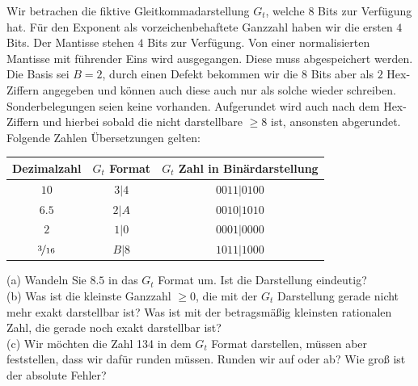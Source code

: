 \documentclass{scrartcl}
\begin{document}
	Wir betrachen die fiktive Gleitkommadarstellung $G_t$, welche $8$ Bits zur Verfügung hat. Für den Exponent als vorzeichenbehaftete Ganzzahl haben wir die ersten $4$ Bits. Der Mantisse stehen $4$ Bits zur Verfügung. Von einer normalisierten Mantisse mit führender Eins wird ausgegangen. Diese muss  abgespeichert werden. Die Basis sei $B = 2$, durch einen Defekt bekommen wir die $8$ Bits aber als $2$ Hex-Ziffern angegeben und können auch diese auch nur als solche wieder schreiben. Sonderbelegungen seien keine vorhanden.
	\n
	Aufgerundet wird auch nach dem Hex-Ziffern und hierbei sobald die nicht darstellbare $\ge 8$ ist, ansonsten abgerundet.
	\n
	 Folgende Zahlen Übersetzungen gelten: \n
	\begin{tabular}{ccc}
		Dezimalzahl & $G_t$ Format & $G_t$ Zahl in Binärdarstellung \\ \toprule
		$10$ 	& $3|4$ 	& $0011|0100$\\
		$6.5$ 	& $2|A$ 	& $0010|1010$ \\
		$2$ 	& $1|0$ 	& $0001|0000$ \\
		$\nicefrac{3}{16}$ 	& $B|8$		& $1011|1000$
	\end{tabular}
	\n
	(a) 
	Wandeln Sie $8.5$ in das $G_t$ Format um. Ist die Darstellung eindeutig?
	\lbreak \lbreak \lbreak
	\\
	(b) 
	Was ist die kleinste Ganzzahl $\ge 0$, die mit der $G_t$ Darstellung gerade nicht mehr exakt darstellbar ist?
	\n 
	Was ist mit der betragsmäßig kleinsten rationalen Zahl, die gerade noch exakt darstellbar ist?
	\lbreak \lbreak \lbreak
	\\
	(c) 
	Wir möchten die Zahl 134 in dem $G_t$ Format darstellen, müssen aber feststellen, dass wir dafür runden müssen. Runden wir auf oder ab? Wie groß ist der absolute Fehler?
	
\end{document}

